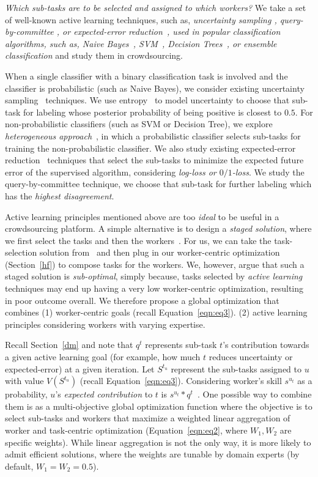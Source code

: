 {\em Which sub-tasks are to be selected and assigned to which workers?} We take a set of well-known active learning techniques, such as, {\em uncertainty sampling \cite{al1}, query-by-committee \cite{qbc1,qbc2}, or expected-error reduction~\cite{error-reduction}, used in popular classification algorithms, such as, Naive Bayes~\cite{entropy}, SVM~\cite{al-svm,al-svm2}, Decision Trees~\cite{al-dtree}, or ensemble classification\cite{korner2006multi}} and study them in crowdsourcing.

When a single classifier with a binary classification task is involved and the classifier is probabilistic (such as Naive Bayes), we consider existing uncertainty sampling~\cite{al1} techniques. We use entropy~\cite{entropy} to model uncertainty to choose that sub-task for labeling whose posterior probability of being positive is closest to $0.5$. For non-probabilistic classifiers (such as SVM or Decision Tree), we explore {\em heterogeneous approach}~\cite{lewis1994heterogeneous}, in which a probabilistic classifier selects sub-tasks for training the non-probabilistic classifier. We also study existing expected-error reduction~\cite{error-reduction} techniques that select the sub-tasks to minimize the expected future error of the supervised algorithm, considering {\em log-loss or $0/1$-loss}. We study the query-by-committee\cite{qbc1,qbc2} technique, we choose that sub-task for further labeling which has the {\em highest disagreement}. 

Active learning principles  mentioned above are too {\em ideal} to be useful in a crowdsourcing platform. A simple alternative is to design a {\em staged solution}, where we first select the tasks and then the workers~\cite{active-learning-cs1}. For us, we can take the task-selection solution from~\cite{active-learning-cs1} and then plug in our worker-centric optimization (Section~\ref{hf}) to compose tasks for the workers. We, however, argue that such a staged solution is {\em sub-optimal}, simply because, tasks selected by {\em active learning} techniques may end up having a very low worker-centric optimization, resulting in poor outcome overall. We therefore propose a global optimization that combines (1) worker-centric goals (recall Equation~\ref{eqn:eq3}). (2) active learning principles considering workers with varying expertise. 

Recall Section~\ref{dm} and note that $q^t$ represents sub-task $t$'s contribution towards a given active learning goal (for example, how much $t$ reduces uncertainty or expected-error) at a given iteration. Let $S^{t_u}$ represent the sub-tasks assigned to $u$ with value 
$V(S^{t_u})$ (recall Equation~\ref{eqn:eq3}). Considering worker's skill $s^{u_t}$ as a probability, $u$'s {\em expected contribution} to $t$ is  $s^{u_t} * q^t$~\cite{clemen2007aggregating}. One possible way to combine them is as a multi-objective global optimization function where the objective is to select sub-tasks and workers that maximize a weighted linear aggregation of worker and task-centric optimization (Equation~\ref{eqn:eq2}, where $W_1,W_2$ are specific weights). While linear aggregation is not the only way, it is more likely to admit efficient solutions, where the weights are tunable by domain experts (by default, $W_1=W_2=0.5$). 


